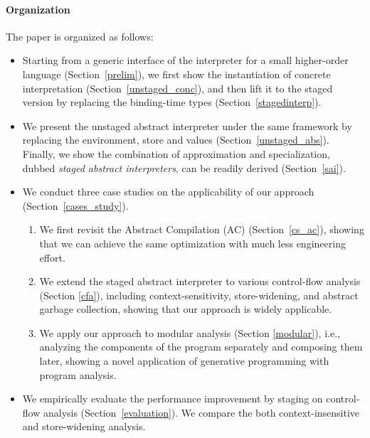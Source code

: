\paragraph{Organization} The paper is organized as follows:
\begin{itemize}[leftmargin=2em]
\item Starting from a generic interface of the interpreter for a small higher-order language
  (Section~\ref{prelim}), we first show the instantiation of concrete
  interpretation (Section~\ref{unstaged_conc}), and then lift it to the staged
  version by replacing the binding-time types (Section~\ref{stagedinterp}).
\item We present the unstaged abstract interpreter under the same framework by
  replacing the environment, store and values (Section~\ref{unstaged_abs}).
  Finally, we show the combination of approximation and specialization, dubbed
  \textit{staged abstract interpreters}, can be readily derived (Section~\ref{sai}).
\item We conduct three case studies on the applicability of our approach
  (Section~\ref{cases_study}).
  \begin{enumerate}
  \item We first revisit the Abstract Compilation (AC)
    \cite{Boucher:1996:ACN:647473.727587} (Section~\ref{cs_ac}), showing that we can
    achieve the same optimization with much less engineering effort.
  \item We extend the staged abstract interpreter to various control-flow
    analysis (Section \ref{cfa}), including context-sensitivity, store-widening, and abstract
    garbage collection, showing that our approach is widely applicable.
  \item We apply our approach to modular analysis (Section \ref{modular}),
    i.e., analyzing the components of the program separately and composing them later,
    showing a novel application of generative programming with program analysis.
  \end{enumerate}
\item We empirically evaluate the performance improvement by staging on
    control-flow analysis (Section~\ref{evaluation}). We compare the both
    context-insensitive and store-widening analysis.
\end{itemize}


